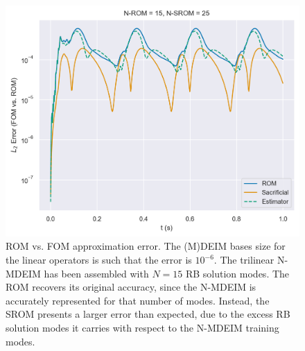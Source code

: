 \documentclass[../../thesis.tex]{subfiles}
\begin{document}
\begin{figure}[h]
    \includegraphics[width =\columnwidth]{research_project/piston/figures/nonlinear_displacement/arbitrary/error_estimation_rom_15_srom_25_modes_15.png}
    \caption{ROM vs. FOM approximation error.
    The (M)DEIM bases size for the linear operators is such that the error is $10^{-6}$.
    The trilinear N-MDEIM has been assembled with $N=15$ RB solution modes. 
    The ROM recovers its original accuracy, since the N-MDEIM is accurately represented for 
    that number of modes.
    Instead, the SROM presents a larger error than expected, 
    due to the excess RB solution modes it carries with respect to the N-MDEIM training modes.}
    \label{fig:nlinear_disp_modes_15_rom_15}
\end{figure}
\end{document}
